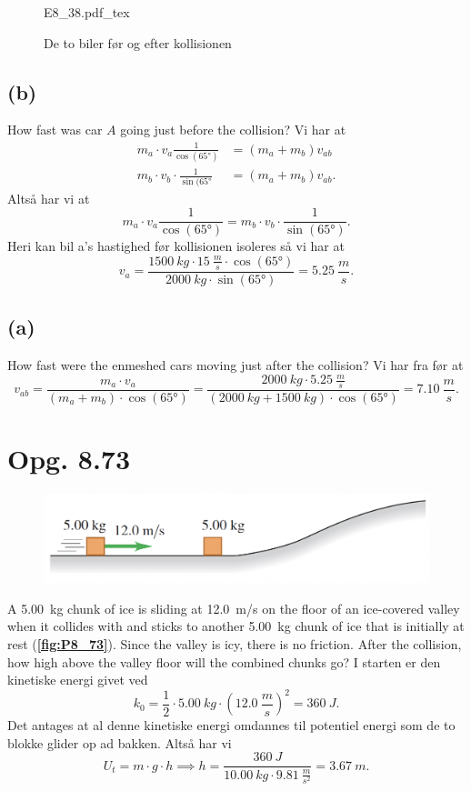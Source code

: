 \documentclass[12pt]{article}
\newcommand{\incfig}[2][1]{%
  \def\svgwidth{#1\columnwidth}
  {#2.pdf_tex}
}
\begin{document}
\begin{figure}[ht]
  \centering
  \incfig[0.8]{E8_38}
  \caption{De to biler før og efter kollisionen}
  \label{fig:E8_38}
\end{figure}

\subsection*{(b)}
How fast was car $A$ going just before the collision?
\bigbreak
Vi har at
\begin{align*}
  m_a\cdot v_a \frac{1}{\cos(\ang{65})}&= \left( m_a + m_b \right) v_{ab}\\
  m_b\cdot v_b\cdot \frac{1}{\sin(\ang{65}} &= (m_a + m_b)v_{ab}
.\end{align*}
Altså har vi at
\[
m_a\cdot v_a \frac{1}{\cos(\ang{65})} = m_b\cdot v_b\cdot \frac{1}{\sin(\ang{65})}
.\] 
Heri kan bil a's hastighed før kollisionen isoleres så vi har at
\[
v_a = \frac{\qty{1500}{kg}\cdot \qty{15}{\frac{m}{s}} \cdot \cos(\ang{65})}{\qty{2000}{kg}\cdot \sin(\ang{65})} = \qty{5,25}{\frac{m}{s}}
.\] 

\subsection*{(a)}
How fast were the enmeshed cars moving just after the collision?
\bigbreak
Vi har fra før at
\[
v_{ab} = \frac{m_a\cdot v_a}{\left( m_a + m_b \right)\cdot \cos(\ang{65})} = \frac{\qty{2000}{kg}\cdot \qty{5,25}{\frac{m}{s}}}{\left( \qty{2000}{kg} + \qty{1500}{kg} \right) \cdot \cos(\ang{65})} = \qty{7,10}{\frac{m}{s}}
.\] 
  

\section*{Opg. 8.73}

\begin{figure} [ht]
  \centering
  \caption{}
  \includegraphics[width=0.5\linewidth]{../figures/P8_73.png}
  \label{fig:P8_73}
\end{figure}

A \qty{5,00}{kg} chunk of ice is sliding at \qty{12,0}{m/s} on the floor of an ice-covered valley when it collides with and sticks to another \qty{5,00}{kg} chunk of ice that is initially at rest (\textbf{\autoref{fig:P8_73}}). Since the valley is icy, there is no friction. After the collision, how high above the valley floor will the combined chunks go?
\bigbreak
I starten er den kinetiske energi givet ved
\[
k_0 = \frac{1}{2}\cdot \qty{5,00}{kg}\cdot \left( \qty{12,0}{\frac{m}{s}} \right)^2 = \qty{360}{J}
.\] 
Det antages at al denne kinetiske energi omdannes til potentiel energi som de to blokke glider op ad bakken. Altså har vi
\[
U_t = m\cdot g\cdot h \implies h = \frac{\qty{360}{J}}{\qty{10,00}{kg} \cdot \qty{9,81}{\frac{m}{s^2}}} = \qty{3,67}{m}
.\] 
\end{document}
